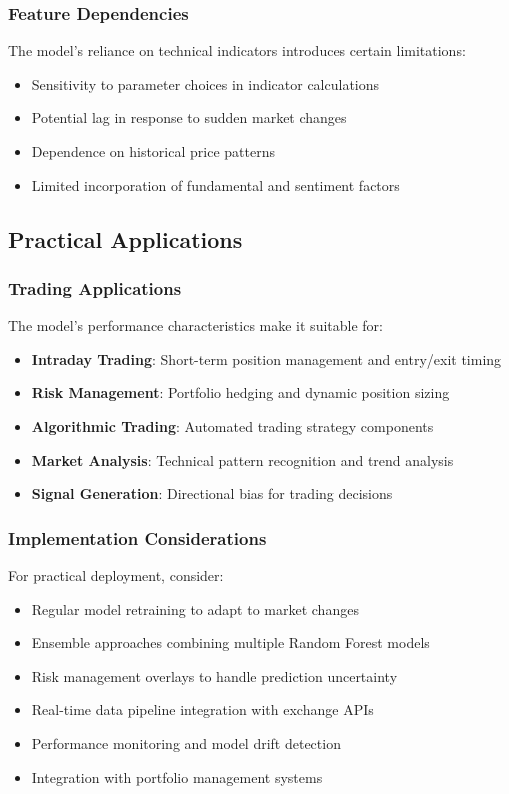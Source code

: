 \documentclass[11pt,a4paper]{article}
\begin{document}
\subsubsection{Feature Dependencies}

The model's reliance on technical indicators introduces certain limitations:
\begin{itemize}
    \item Sensitivity to parameter choices in indicator calculations
    \item Potential lag in response to sudden market changes
    \item Dependence on historical price patterns
    \item Limited incorporation of fundamental and sentiment factors
\end{itemize}

\subsection{Practical Applications}

\subsubsection{Trading Applications}

The model's performance characteristics make it suitable for:
\begin{itemize}
    \item \textbf{Intraday Trading}: Short-term position management and entry/exit timing
    \item \textbf{Risk Management}: Portfolio hedging and dynamic position sizing
    \item \textbf{Algorithmic Trading}: Automated trading strategy components
    \item \textbf{Market Analysis}: Technical pattern recognition and trend analysis
    \item \textbf{Signal Generation}: Directional bias for trading decisions
\end{itemize}

\subsubsection{Implementation Considerations}

For practical deployment, consider:
\begin{itemize}
    \item Regular model retraining to adapt to market changes
    \item Ensemble approaches combining multiple Random Forest models
    \item Risk management overlays to handle prediction uncertainty
    \item Real-time data pipeline integration with exchange APIs
    \item Performance monitoring and model drift detection
    \item Integration with portfolio management systems
\end{itemize}
\end{document}

